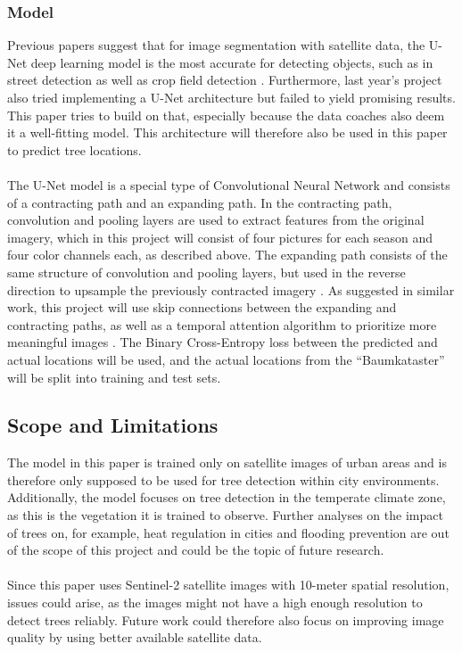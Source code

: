 \subsubsection{Model}

Previous papers suggest that for image segmentation with satellite data, the U-Net deep learning model is the most accurate for detecting objects, such as in street detection \cite{pesek2024convolution} as well as crop field detection \cite{garnot2021panoptic}. Furthermore, last year's project also tried implementing a U-Net architecture but failed to yield promising results. This paper tries to build on that, especially because the data coaches also deem it a well-fitting model. This architecture will therefore also be used in this paper to predict tree locations. \\
\\
The U-Net model is a special type of Convolutional Neural Network and consists of a contracting path and an expanding path. In the contracting path, convolution and pooling layers are used to extract features from the original imagery, which in this project will consist of four pictures for each season and four color channels each, as described above. The expanding path consists of the same structure of convolution and pooling layers, but used in the reverse direction to upsample the previously contracted imagery \cite{aramendia2024}. As suggested in similar work, this project will use skip connections between the expanding and contracting paths, as well as a temporal attention algorithm to prioritize more meaningful images \cite{garnot2021panoptic}. The Binary Cross-Entropy loss between the predicted and actual locations will be used, and the actual locations from the ``Baumkataster'' will be split into training and test sets.

\subsection{Scope and Limitations}

The model in this paper is trained only on satellite images of urban areas and is therefore only supposed to be used for tree detection within city environments. Additionally, the model focuses on tree detection in the temperate climate zone, as this is the vegetation it is trained to observe. Further analyses on the impact of trees on, for example, heat regulation in cities and flooding prevention are out of the scope of this project and could be the topic of future research. \\
\\
Since this paper uses Sentinel-2 satellite images with 10-meter spatial resolution, issues could arise, as the images might not have a high enough resolution to detect trees reliably. Future work could therefore also focus on improving image quality by using better available satellite data.